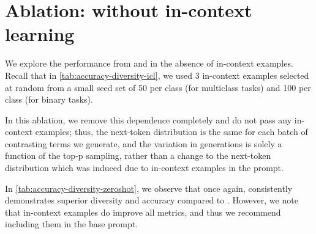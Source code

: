 \section{Ablation: without in-context learning}
\label{app:zeroshot}

We explore the performance from \fewgen{} and \corrsyn{} in the absence of in-context examples. Recall that in \autoref{tab:accuracy-diversity-icl}, we used 3 in-context examples selected at random from a small seed set of 50 per class (for multiclass tasks) and 100 per class (for binary tasks). 

In this ablation, we remove this dependence completely and do not pass any in-context examples; thus, the next-token distribution is the same for each batch of contrasting terms we generate, and the variation in generations is solely a function of the top-p sampling, rather than a change to the next-token distribution which was induced due to in-context examples in the prompt.

In \autoref{tab:accuracy-diversity-zeroshot}, we observe that once again, \corrsyn{} consistently demonstrates superior diversity and accuracy compared to \fewgen. However, we note that in-context examples do improve all metrics, and thus we recommend including them in the base prompt.
